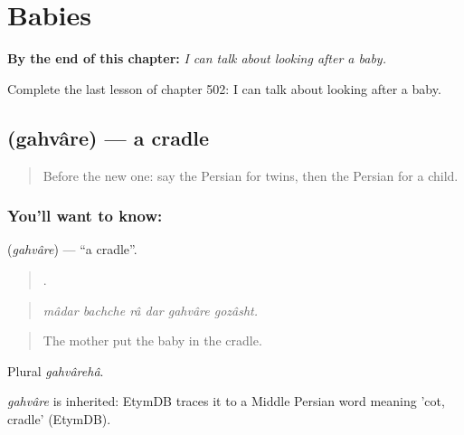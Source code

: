 
\chapter{Babies}
\label{ch:fa-babies}

\begin{chapteropening}
\textbf{By the end of this chapter:} \emph{I can talk about looking after a baby.}

Complete the last lesson of chapter 502: I can talk about looking after a baby.
\end{chapteropening}

\section[\texorpdfstring{\fa{گهواره} (gahvâre)}{گهواره (gahvâre)}]{ (gahvâre) — a cradle}

\label{lesson:FA-C502-gahvare}



\begin{quote}
Before the new one: say the Persian for twins, then the Persian for a child.
\end{quote}

\subsection*{You'll want to know: }
\textbf{} (\emph{gahvâre}) — \textquotedblleft{}a cradle\textquotedblright{}.

\begin{quote}
     .
\end{quote}

\begin{quote}
\emph{mâdar bachche râ dar gahvâre gozâsht.}
\end{quote}

\begin{quote}
The mother put the baby in the cradle.
\end{quote}

Plural \emph{gahvârehâ}.

\begin{cousinweb}
\emph{gahvâre} is inherited: EtymDB traces it to a Middle Persian word meaning 'cot, cradle' (EtymDB).
\end{cousinweb}

